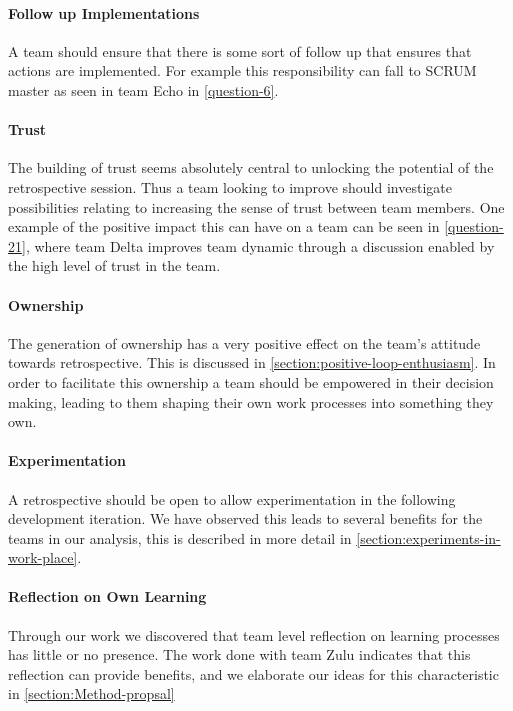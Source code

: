 \paragraph{Follow up Implementations}
A team should ensure that there is some sort of follow up that ensures that actions are implemented. For example this responsibility can fall to SCRUM master as seen in team Echo in \autoref{question-6}.

\paragraph{Trust}
The building of trust seems absolutely central to unlocking the potential of the retrospective session. Thus a team looking to improve should investigate possibilities relating to increasing the sense of trust between team members. One example of the positive impact this can have on a team can be seen in \autoref{question-21}, where team Delta improves team dynamic through a discussion enabled by the high level of trust in the team.

\paragraph{Ownership}
The generation of ownership has a very positive effect on the team's attitude towards retrospective. This is discussed in \autoref{section:positive-loop-enthusiasm}. In order to facilitate this ownership a team should be empowered in their decision making, leading to them shaping their own work processes into something they own.

\paragraph{Experimentation}
A retrospective should be open to allow experimentation in the following development iteration. We have observed this leads to several benefits for the teams in our analysis, this is described in more detail in \autoref{section:experiments-in-work-place}. 

\paragraph{Reflection on Own Learning}
Through our work we discovered that team level reflection on learning processes has little or no presence. The work done with team Zulu indicates that this reflection can provide benefits, and we elaborate our ideas for this characteristic in \autoref{section:Method-propsal}

